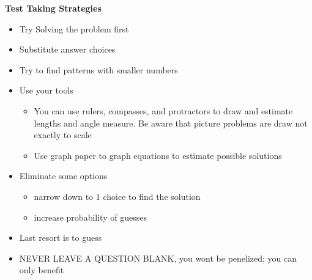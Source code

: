 \documentclass[11pt,letterpaper]{article}
\begin{document}
\centering
\begin{minipage}{\textwidth}
     \noindent \textbf{Test Taking Strategies}
     \begin{itemize}
          \item Try Solving the problem first
          \item Substitute answer choices
          \item Try to find patterns with smaller numbers
          \item Use your tools
           \begin{itemize}
               \item You can use rulers, compasses, and protractors to draw and estimate lengths and angle measure. Be aware that picture problems are draw not exactly to scale
               \item Use graph paper to graph equations to estimate possible solutions
          \end{itemize}
          \item Eliminate some options 
          \begin{itemize}
               \item narrow down to 1 choice to find the solution
               \item increase probability of guesses
          \end{itemize}
          \item Last resort is to guess
          \item NEVER LEAVE A QUESTION BLANK, you wont be penelized; you can only benefit
          
     \end{itemize}

\end{minipage}


\vspace{0.4cm}
\end{document}
